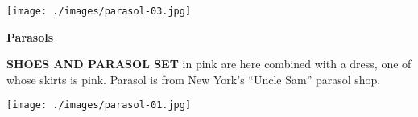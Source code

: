 \begin{minipage}{\textwidth}
\begin{minipage}[b][\textheight][b]{.47\linewidth}
\vspace*{2cm}

\texttt{[image: ./images/parasol-03.jpg]}\par
\vspace{2\baselineskip}

\centerline{\bfseries\Huge Parasols}
\vspace{2\baselineskip}

\begin{quote}
\lipsum[2]
\end{quote}

\vfill

\textbf{SHOES AND PARASOL SET} in pink are here combined with a dress, one of whose skirts is pink. Parasol is from New York's ``Uncle Sam'' parasol shop.
\end{minipage}\hspace*{1cm}
\begin{minipage}[b]{.53\linewidth}
\mbox{}
\noindent\texttt{[image: ./images/parasol-01.jpg]}\par
\end{minipage}
\end{minipage}



